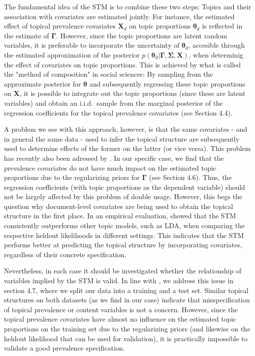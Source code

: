 \documentclass[12pt]{article}
\begin{document}
The fundamental idea of the STM is to combine these two steps: Topics and their association with covariates are estimated jointly. For instance, the estimated effect of topical prevalence covariates $\boldsymbol{X}_d$ on topic proportions $\boldsymbol{\theta}_d$ is reflected in the estimate of $\boldsymbol{\Gamma}$. However, since the topic proportions are latent random variables, it is preferable to incorporate the uncertainty of $\boldsymbol{\theta}_d$, accesible through the estimated approximation of the posterior $p(\boldsymbol{\theta}_d | \boldsymbol{\Gamma}, \boldsymbol{\Sigma}, \boldsymbol{X})$, when determinig the effect of covariates on topic proportions. This is achieved by what is called the "method of composition" in social sciences: By sampling from the approximate posterior for $\boldsymbol{\theta}$ and subsequently regressing these topic proportions on $\boldsymbol{X}$, it is possible to integrate out the topic proportions (since these are latent variables) and obtain an i.i.d.\ sample from the marginal posterior of the regression coefficients for the topical prevalence covariates (see Section 4.4).

A problem we see with this approach, however, is that the same covariates - and in general the same data - used to infer the topical structure are subsequently used to determine effects of the former on the latter (or vice versa). This problem has recently also been adressed by \cite{egami2018make}. In our specific case, we find that the prevalence covariates do not have much impact on the estimated topic proportions due to the regularizing priors for $\boldsymbol{\Gamma}$ (see Section 4.6). Thus, the regression coefficients (with topic proportions as the dependent variable) should not be largely affected by this problem of double usage. However, this begs the question why document-level covariates are being used to obtain the topical structure in the first place. In an empirical evaluation, \cite{roberts2016model} showed that the STM consistently outperforms other topic models, such as LDA, when comparing the respective heldout likelihoods in different settings. This indicates that the STM performs better at predicting the topical structure by incorporating covariates, regardless of their concrete specification.

Nevertheless, in each case it should be investigated whether the relationship of variables implied by the STM is valid. In line with \cite{egami2018make}, we address this issue in section 4.7, where we split our data into a training and a test set. Similar topical structures on both datasets (as we find in our case) indicate that misspecification of topical prevalence or content variables is not a concern. However, since the topical prevalence covariates have almost no influence on the estimated topic proportions on the training set due to the regularizing priors (and likewise on the heldout likelihood that can be used for validation), it is practically impossible to validate a good prevalence specification.
\end{document}
